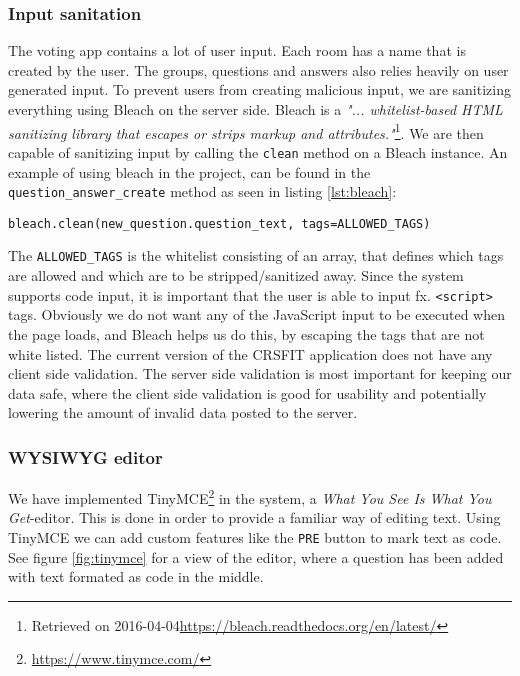 \subsubsection*{Input sanitation}
The voting app contains a lot of user input. Each room has a name that is created by the user. The groups, questions and answers also relies heavily on user generated input. To prevent users from creating malicious input, we are sanitizing everything using Bleach on the server side. Bleach is a \emph{"... whitelist-based HTML sanitizing library that escapes or strips markup and attributes."}\footnote{Retrieved on 2016-04-04\url{https://bleach.readthedocs.org/en/latest/}}. We are then capable of sanitizing input by calling the \texttt{clean} method on a Bleach instance. An example of using bleach in the project, can be found in the \texttt{question\_answer\_create} method as seen in listing \ref{lst:bleach}:

\begin{lstlisting}[caption=Using Bleach to sanitize input, label=lst:bleach]
bleach.clean(new_question.question_text, tags=ALLOWED_TAGS)
\end{lstlisting}

The \texttt{ALLOWED\_TAGS} is the whitelist consisting of an array, that defines which tags are allowed and which are to be stripped/sanitized away. Since the system supports code input, it is important that the user is able to input fx. \texttt{<script>} tags. Obviously we do not want any of the JavaScript input to be executed when the page loads, and Bleach helps us do this, by escaping the tags that are not white listed.
The current version of the CRSFIT application does not have any client side validation. The server side validation is most important for keeping our data safe, where the client side validation is good for usability and potentially lowering the amount of invalid data posted to the server.

\subsubsection*{WYSIWYG editor}
We have implemented TinyMCE\footnote{\url{https://www.tinymce.com/}} in the system, a \emph{What You See Is What You Get}-editor. This is done in order to provide a familiar way of editing text. Using TinyMCE we can add custom features like the \texttt{PRE} button to mark text as code. See figure \ref{fig:tinymce} for a view of the editor, where a question has been added with text formated as code in the middle.

